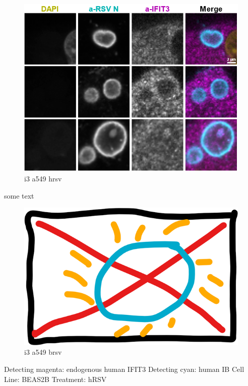 \begin{figure}
    \centering
    \includegraphics[width=1\linewidth]{08. Chapter 3/Figs/04. IFIT3/02. a549 hrsv.png}
    \caption[i3 a549 hrsv]{i3 a549 hrsv}
    \label{i3 a549 hrsv}
\end{figure}

some text

\begin{figure}
    \centering
    \includegraphics[width=0.5\linewidth]{06. Chapter 1//Figs/00. placeholder.png}
    \caption[i3 a549 brsv]{i3 a549 brsv}
    \label{i3 a549 brsv}
\end{figure}

Detecting magenta: endogenous human IFIT3 \newline
Detecting cyan: human IB \newline
Cell Line: BEAS2B \newline
Treatment: hRSV \newline

